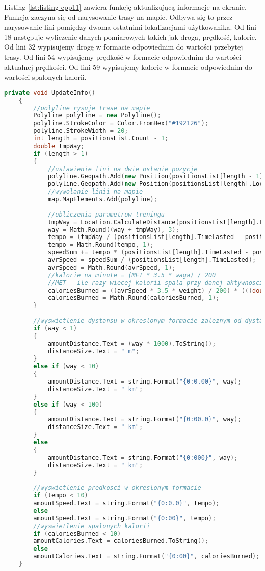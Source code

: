 Listing \ref{lst:listing-cpp11} zawiera funkcję aktualizującą informacje na ekranie. Funkcja zaczyna się od narysowanie trasy na mapie. Odbywa się to przez narysowanie lini pomiędzy dwoma ostatnimi lokalizacjami użytkowanika. Od lini 18 następuje wyliczenie danych pomiarowych takich jak droga, prędkość, kalorie. Od lini 32 wypisujemy drogę w formacie odpowiednim do wartości przebytej trasy. Od lini 54 wypisujemy prędkość w formacie odpowiednim do wartości aktualnej prędkości. Od lini 59 wypisujemy kalorie w formacie odpowiednim do wartości spalonych kalorii. 
\begin{lstlisting}[caption=Aktualizowanie informacji na ekranie, label={lst:listing-cpp11}, language=C++]
	private void UpdateInfo()
	{
		//polyline rysuje trase na mapie
		Polyline polyline = new Polyline();
		polyline.StrokeColor = Color.FromHex("#192126");
		polyline.StrokeWidth = 20;
		int length = positionsList.Count - 1;
		double tmpWay;
		if (length > 1)
		{
			//ustawienie lini na dwie ostanie pozycje
			polyline.Geopath.Add(new Position(positionsList[length - 1].Location.Latitude, positionsList[length - 1].Location.Longitude));
			polyline.Geopath.Add(new Position(positionsList[length].Location.Latitude, positionsList[length].Location.Longitude));
			//wywolanie linii na mapie
			map.MapElements.Add(polyline);
			
			//obliczenia parametrow treningu
			tmpWay = Location.CalculateDistance(positionsList[length].Location, positionsList[length - 1].Location, DistanceUnits.Kilometers);
			way = Math.Round((way + tmpWay), 3);
			tempo = (tmpWay / (positionsList[length].TimeLasted - positionsList[length - 1].TimeLasted)) * 3600;
			tempo = Math.Round(tempo, 1);
			speedSum += tempo * (positionsList[length].TimeLasted - positionsList[length - 1].TimeLasted);
			avrSpeed = speedSum / (positionsList[length].TimeLasted);
			avrSpeed = Math.Round(avrSpeed, 1);
			//kalorie na minute = (MET * 3.5 * waga) / 200
			//MET - ile razy wiecej kalorii spala przy danej aktywnosci w porowaniu do odpoczynku
			caloriesBurned = ((avrSpeed * 3.5 * weight) / 200) * (((double)positionsList[length].TimeLasted) / 60);
			caloriesBurned = Math.Round(caloriesBurned, 1);
		}
		
		//wyswietlenie dystansu w okreslonym formacie zaleznym od dystansu
		if (way < 1)
		{
			amountDistance.Text = (way * 1000).ToString();
			distanceSize.Text = " m";
		}
		else if (way < 10)
		{
			amountDistance.Text = string.Format("{0:0.00}", way);
			distanceSize.Text = " km";
		}
		else if (way < 100)
		{
			amountDistance.Text = string.Format("{0:00.0}", way);
			distanceSize.Text = " km";
		}
		else
		{
			amountDistance.Text = string.Format("{0:000}", way);
			distanceSize.Text = " km";
		}
		
		//wyswietlenie predkosci w okreslonym formacie
		if (tempo < 10)
		amountSpeed.Text = string.Format("{0:0.0}", tempo);
		else
		amountSpeed.Text = string.Format("{0:00}", tempo);
		//wyswietlenie spalonych kalorii
		if (caloriesBurned < 10)
		amountCalories.Text = caloriesBurned.ToString();
		else
		amountCalories.Text = string.Format("{0:00}", caloriesBurned);
	}
\end{lstlisting}

